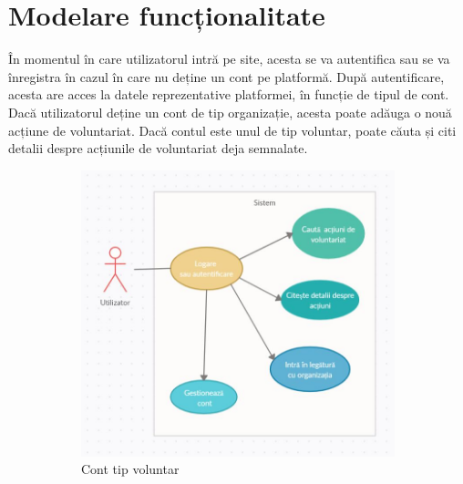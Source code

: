 \documentclass[12pt,a4paper]{report}
\begin{document}
\section{Modelare funcționalitate}
\par
În momentul în care utilizatorul intră pe site, acesta se va autentifica sau se va înregistra în cazul în care nu deține un cont pe platformă. După autentificare, acesta are acces la datele reprezentative platformei, în funcție de tipul de cont. Dacă utilizatorul deține un cont de tip organizație, acesta poate adăuga o nouă acțiune de voluntariat. Dacă contul este unul de tip voluntar, poate căuta și citi detalii despre acțiunile de voluntariat deja semnalate.
\\
\begin{figure}[h!]
  \centering
  \begin{subfigure}[b]{0.4\linewidth}
    \includegraphics[width=\linewidth]{./imagini/UC_Voluntar.JPG}
    \caption{Cont tip voluntar}
  \end{subfigure}
  \begin{subfigure}[b]{0.42\linewidth}

\end{subfigure}
\end{figure}
\end{document}
